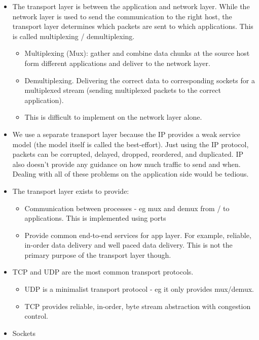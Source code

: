 \documentclass[]{article}
\providecommand{\tightlist}{%
  \setlength{\itemsep}{0pt}\setlength{\parskip}{0pt}}
\begin{document}
\begin{itemize}
\tightlist
\item
  The transport layer is between the application and network layer.
  While the network layer is used to send the communication to the right
  host, the transport layer determines which packets are sent to which
  applications. This is called multiplexing / demultiplexing.

  \begin{itemize}
  \tightlist
  \item
    Multiplexing (Mux): gather and combine data chunks at the source
    host form different applications and deliver to the network layer.
  \item
    Demultiplexing. Delivering the correct data to corresponding sockets
    for a multiplexed stream (sending multiplexed packets to the correct
    application).
  \item
    This is difficult to implement on the network layer alone.
  \end{itemize}
\item
  We use a separate transport layer because the IP provides a weak
  service model (the model itself is called the best-effort). Just using
  the IP protocol, packets can be corrupted, delayed, dropped,
  reordered, and duplicated. IP also doesn't provide any guidance on how
  much traffic to send and when. Dealing with all of these problems on
  the application side would be tedious.
\item
  The transport layer exists to provide:

  \begin{itemize}
  \tightlist
  \item
    Communication between processes - eg mux and demux from / to
    applications. This is implemented using ports
  \item
    Provide common end-to-end services for app layer. For example,
    reliable, in-order data delivery and well paced data delivery. This
    is not the primary purpose of the transport layer though.
  \end{itemize}
\item
  TCP and UDP are the most common transport protocols.

  \begin{itemize}
  \tightlist
  \item
    UDP is a minimalist transport protocol - eg it only provides
    mux/demux.
  \item
    TCP provides reliable, in-order, byte stream abstraction with
    congestion control.
  \end{itemize}
\item
  Sockets


\end{itemize}
\end{document}
